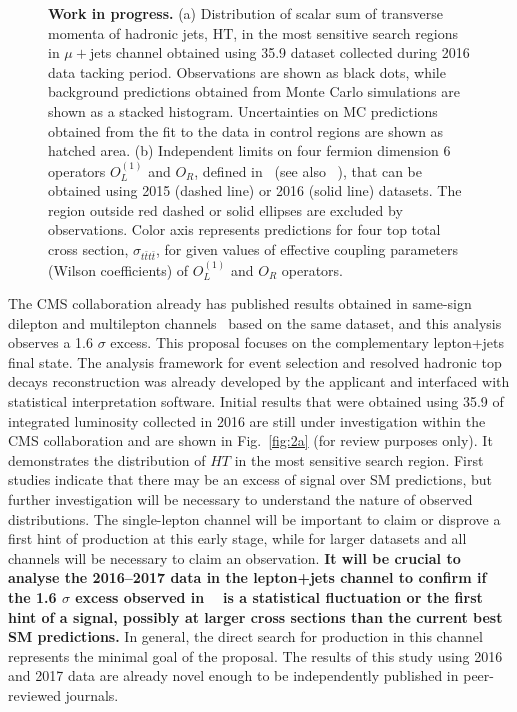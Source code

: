 {\begin{figure}
\begin{subfigure}[t]{0.5\textwidth}
\end{subfigure}%
\caption{\textbf{Work in progress.} (a) Distribution of scalar sum of transverse momenta of hadronic jets, $\mathrm{HT}$, in the most sensitive search regions in $\mu+$jets channel obtained using 35.9 \invfb dataset collected during 2016 data tacking period. Observations are shown as black dots, while background predictions obtained from Monte Carlo simulations are shown as a stacked histogram. Uncertainties on MC predictions obtained from the fit to the data in control regions are shown as hatched area. (b) Independent limits on four fermion dimension 6 operators $O_{L}^{\left(1 \right) }$ and $O_R$, defined in~\cite{DegrandeEFTthesis} (see also ~\cite{Zhang:2017mls}), that can be obtained using 2015 (dashed line) or 2016 (solid line) datasets. The region outside red dashed or solid ellipses are excluded by observations. Color axis represents predictions for four top total cross section, $\sigma_{t\bar{t}t\bar{t}}$, for given values of effective coupling parameters (Wilson coefficients) of $O_{L}^{\left(1 \right) }$ and $O_R$ operators. }
\label{fig:mu}
\end{figure}
The CMS collaboration already has published results obtained in same-sign dilepton and multilepton channels~\cite{Sirunyan:2017roi} based on the same dataset, and this analysis observes a 1.6 $\sigma$ excess. This proposal focuses on the complementary lepton+jets final state. The analysis framework for event selection and resolved hadronic top decays reconstruction was already developed by the applicant and interfaced with statistical interpretation software. Initial results that were obtained using 35.9 \invfb of integrated luminosity collected in 2016 are still under investigation within the CMS collaboration and are shown in Fig.~\ref{fig:2a} (for review purposes only). It demonstrates the distribution of $HT$ in the most sensitive search region. First studies indicate that there may be an excess of signal over SM predictions, but further investigation will be necessary to understand the nature of observed distributions. The single-lepton channel will be important to claim or disprove a first hint of \tttt production at this early stage, while for larger datasets and all channels will be necessary to claim an observation. \textbf{It will be crucial to analyse the 2016--2017 data in the lepton+jets channel to confirm if the 1.6 $\sigma$ excess observed in ~\cite{Sirunyan:2017roi} is a statistical fluctuation or the first hint of a signal, possibly at larger cross sections than the current best SM predictions.} In general, the direct search for \tttt production in this channel represents the minimal goal of the proposal. The results of this study using 2016 and 2017 data are already novel enough to be independently published in peer-reviewed journals. }

